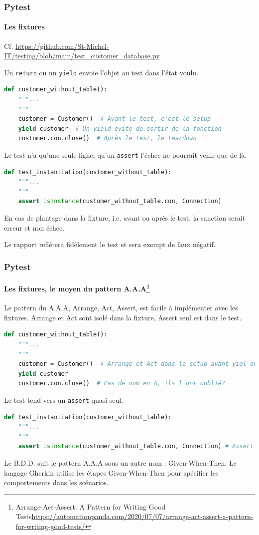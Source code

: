 \documentclass{beamer}
\begin{document}
    \begin{frame}[fragile]
        \frametitle{Pytest}
        \framesubtitle{Les fixtures}
        \transdissolve
        Cf. \url{https://github.com/St-Michel-IT/testing/blob/main/test_customer_database.py}

        Un \lstinline{return} ou un \lstinline{yield} envoie l'objet au test dans l'état voulu.
        \begin{lstlisting}[language=Python]
def customer_without_table():
    """...
    """
    customer = Customer()  # Avant le test, c'est le setup
    yield customer  # Un yield évite de sortir de la fonction
    customer.con.close()  # Après le test, le teardown
        \end{lstlisting}
        Le test n'a qu'une seule ligne, qu'un \lstinline{assert} l'échec ne
        pourrait venir que de là.
        \begin{lstlisting}[language=Python]
def test_instantiation(customer_without_table):
    """...
    """
    assert isinstance(customer_without_table.con, Connection)
        \end{lstlisting}
        En cas de plantage dans la fixture, i.e. avant ou après le test, la sanction
        serait erreur et non échec.

        Le rapport reflétera fidèlement le test et sera exempt de faux négatif.
    \end{frame}

    \begin{frame}[fragile]
        \frametitle{Pytest}
        \framesubtitle{Les fixtures, le moyen du pattern A.A.A\footnote{Arrange-Act-Assert: A Pattern for Writing Good Tests\url{https://automationpanda.com/2020/07/07/arrange-act-assert-a-pattern-for-writing-good-tests/}}}
        \transdissolve
        Le pattern du A.A.A, Arrange, Act, Assert, est facile à implémenter avec les fixtures.
        Arrange et Act sont isolé dans la fixture, Assert seul est dans le test.

        \begin{lstlisting}[language=Python]
def customer_without_table():
    """...
    """
    customer = Customer()  # Arrange et Act dans le setup avant yiel ou return
    yield customer
    customer.con.close()  # Pas de nom en A, ils l'ont oublié?
        \end{lstlisting}
        Le test tend vers un \lstinline{assert} quasi seul.
        \begin{lstlisting}[language=Python]
def test_instantiation(customer_without_table):
    """...
    """
    assert isinstance(customer_without_table.con, Connection) # Assert
        \end{lstlisting}
        Le B.D.D. suit le pattern A.A.A sous un autre nom : Given-When-Then.
        Le langage Gherkin utilise les étapes Given-When-Then pour spécifier les comportements dans les scénarios.
    \end{frame}
\end{document}

